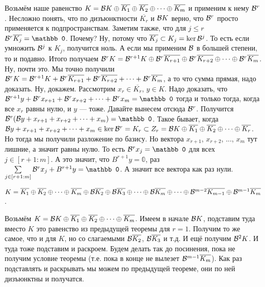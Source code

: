 \documentclass{article}
\begin{document}
\begin{itemize}
\begin{Proof}
            Возьмём наше равенство $K={\mathcal{B}} K\oplus\overline{K_1}\oplus\overline{K_2}\oplus\cdots\oplus\overline{K_m}$ и применим к нему ${\mathcal{B}}^r$. Несложно понять, что по дизъюнктности $\overline{K_r}$ и ${\mathcal{B}} K$ верно, что ${\mathcal{B}}^r$ просто применяется к подпространствам. Заметим также, что для $j\leqslant r$ $\scriptB^r\overline{K_j}=\mathbb0$. Почему? Ну, потому что $\overline{K_j}\subset K_j=\ker{\mathcal{B}}^j$. То есть если умножить ${\mathcal{B}}^j$ к $K_j$, получится ноль. А если мы применим ${\mathcal{B}}$ в большей степени, то и подавно. Итого получаем ${\mathcal{B}}^rK={\mathcal{B}}^{r+1}K\oplus{\mathcal{B}}^r\overline{K_{r+1}}\oplus{\mathcal{B}}^r\overline{K_{r+2}}\oplus\cdots\oplus{\mathcal{B}}^r\overline{K_m}$. Ну, почти это. Мы точно получили ${\mathcal{B}}^rK={\mathcal{B}}^{r+1}K+{\mathcal{B}}^r\overline{K_{r+1}}+{\mathcal{B}}^r\overline{K_{r+2}}+\cdots+{\mathcal{B}}^r\overline{K_m}$, а то что сумма прямая, надо доказать. Ну, докажем. Рассмотрим $x_r\in\overline{K_r}$, $y\in K$. Надо доказать, что $\scriptB^{r+1}y+\scriptB^rx_{r+1}+\scriptB^rx_{r+2}+\cdots+\scriptB^rx_m=\mathbb0$ тогда и только тогда, когда все $x_r$ равны нулю, и $y$ --- тоже. Давайте вынесем отсюда ${\mathcal{B}}^r$. Получится $\scriptB^r(\scriptB y+x_{r+1}+x_{r+2}+\cdots+x_m)=\mathbb0$. Такое бывает, когда ${\mathcal{B}} y+x_{r+1}+x_{r+2}+\cdots+x_m\in\ker{\mathcal{B}}^r=K_r\subset Z_r={\mathcal{B}} K\oplus\overline{K_1}\oplus\overline{K_2}\oplus\cdots\oplus\overline{K_r}$. Но тогда мы получили разложение по базису. Но вектора $x_{r+1}$, $x_{r+2}$, ..., $x_m$ тут лишние, а значит равны нулю. То есть $\scriptB^r x_j=\mathbb0$ для всех $j\in[r+1:m]$. А это значит, что $B^{r+1}y=\mathbb0$, раз $\sum\limits_{j\in[r+1:m]}\scriptB^r x_j+B^{r+1}y=\mathbb0$. А значит все вектора как раз нули.
        \end{Proof}
        \thm $K=\overline{K_1}\oplus\overline{K_2}\oplus\cdots\oplus\overline{K_m}\oplus{\mathcal{B}}\overline{K_2}\oplus{\mathcal{B}}\overline{K_3}\oplus\cdots\oplus{\mathcal{B}}\overline{K_m}\oplus\cdots\oplus{\mathcal{B}}^{m-2}\overline{K_{m-1}}\oplus{\mathcal{B}}^{m-1}\overline{K_m}$.
        \begin{Proof}
            Возьмём $K={\mathcal{B}} K\oplus\overline{K_1}\oplus\overline{K_2}\oplus\cdots\oplus\overline{K_m}$. Имеем в начале ${\mathcal{B}} K$, подставим туда вместо $K$ это равенство из предыдущей теоремы для $r=1$. Получим то же самое, что и для $K$, но со слагаемыми ${\mathcal{B}}\overline{K_2}$, ${\mathcal{B}}\overline{K_3}$ и т.д. И ещё получим ${\mathcal{B}}^2 K$. И туда тоже подставим и раскроем. Будем делать так до посинения, пока не получим условие теоремы (т.е. пока в конце не вылезет ${\mathcal{B}}^{m-1}\overline{K_m}$). Как раз подставлять и раскрывать мы можем по предыдущей теореме, они по ней дизъюнктны и получатся.

\end{Proof}
\end{itemize}
\end{document}
